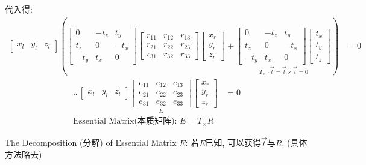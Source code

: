 代入得: 
\begin{align*}
    \begin{bmatrix}
        x_l&y_l&z_l
    \end{bmatrix}\left(\begin{bmatrix}
        0&-t_z&t_y\\
        t_z&0&-t_x\\
        -t_y&t_x&0
    \end{bmatrix}\begin{bmatrix}
        r_{11} & r_{12} & r_{13}\\
        r_{21} & r_{22} & r_{23}\\
        r_{31} & r_{32} & r_{33}
    \end{bmatrix}\begin{bmatrix}
        x_r\\y_r\\z_r
    \end{bmatrix}+
    \underset{T_{\times} \cdot \vec{t}=\vec{t}\times\vec{t}=0}{\begin{bmatrix}
        0&-t_z&t_y\\
        t_z&0&-t_x\\
        -t_y&t_x&0
    \end{bmatrix}\begin{bmatrix}
        t_x\\t_y\\t_z
    \end{bmatrix} }
    \right)&=0
\end{align*}
\begin{align*}
    \therefore \,  \begin{bmatrix}
        x_l&y_l&z_l
    \end{bmatrix}
    \underset{E}{\begin{bmatrix}
        e_{11} & e_{12} & e_{13} \\
        e_{21} & e_{22} & e_{23} \\
        e_{31} & e_{32} & e_{33}
    \end{bmatrix}}\begin{bmatrix}
        x_r\\y_r\\z_r
    \end{bmatrix}&=0\\
    \text{Essential Matrix(本质矩阵): }E=T_{\times}R
\end{align*}

The Decomposition (分解) of Essential Matrix $E$: 若$E$已知, 可以获得$\vec{t}$与$R$. (具体方法略去)

